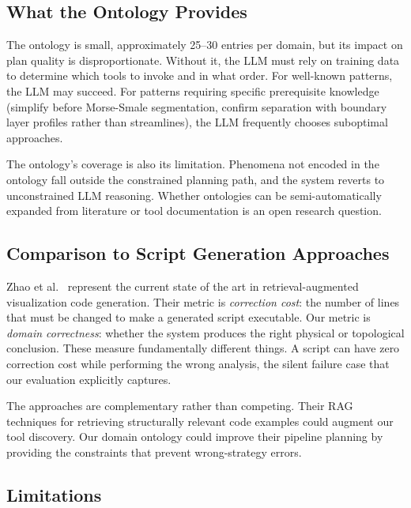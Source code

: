 \documentclass{vgtc}                          %
\begin{document}
\subsection{What the Ontology Provides}

The ontology is small, approximately 25--30 entries per domain, but its impact
on plan quality is disproportionate.
Without it, the LLM must rely on training data to determine which tools to
invoke and in what order.
For well-known patterns, the LLM may succeed.
For patterns requiring specific prerequisite knowledge (simplify before
Morse-Smale segmentation, confirm separation with boundary layer profiles
rather than streamlines), the LLM frequently chooses suboptimal approaches.

The ontology's coverage is also its limitation.
Phenomena not encoded in the ontology fall outside the constrained planning
path, and the system reverts to unconstrained LLM reasoning.
Whether ontologies can be semi-automatically expanded from literature or tool
documentation is an open research question.

\subsection{Comparison to Script Generation Approaches}

Zhao et al.~\cite{Zhao:2026:RAG} represent the current state of the art in
retrieval-augmented visualization code generation.
Their metric is \textit{correction cost}: the number of lines that must be
changed to make a generated script executable.
Our metric is \textit{domain correctness}: whether the system produces the
right physical or topological conclusion.
These measure fundamentally different things.
A script can have zero correction cost while performing the wrong analysis, the
silent failure case that our evaluation explicitly captures.

The approaches are complementary rather than competing.
Their RAG techniques for retrieving structurally relevant code examples could
augment our tool discovery.
Our domain ontology could improve their pipeline planning by providing the
constraints that prevent wrong-strategy errors.

\subsection{Limitations}
\end{document}
